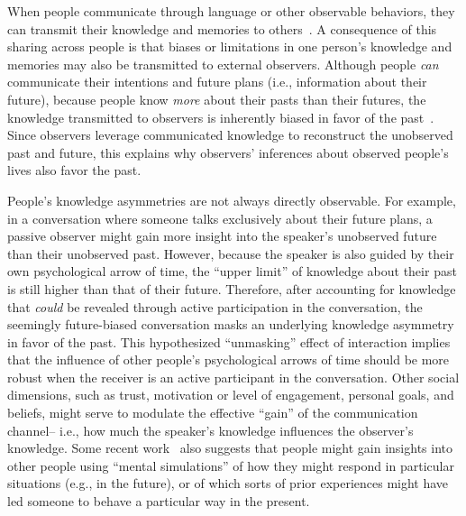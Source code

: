 \documentclass[10pt]{article}
\begin{document}
When people communicate through language or other observable behaviors, they can transmit their knowledge and memories to others~\citep{HirsEcht12, MahrCsib18, Dess07, ZadbEtal17}. A consequence of this sharing across people is that biases or limitations in one person's knowledge and memories may also be transmitted to external observers. Although people \textit{can} communicate their intentions and future plans (i.e., information about their future), because people know \textit{more} about their pasts than their futures, the knowledge transmitted to observers is inherently biased in favor of the past~\citep[Fig.~\ref{fig:discussion}; ][]{DemiEtal18}. Since observers leverage communicated knowledge to reconstruct the unobserved past and future, this explains why observers' inferences about observed people's lives also favor the past.

People's knowledge asymmetries are not always directly observable. For example, in a conversation where someone talks exclusively about their future plans, a passive observer might gain more insight into the speaker's unobserved future than their unobserved past. However, because the speaker is also guided by their own psychological arrow of time, the ``upper limit'' of knowledge about their past is still higher than that of their future. Therefore, after accounting for knowledge that \textit{could} be revealed through active participation in the conversation, the seemingly future-biased conversation masks an underlying knowledge asymmetry in favor of the past. This hypothesized ``unmasking'' effect of interaction implies that the influence of other people's psychological arrows of time should be more robust when the receiver is an active participant in the conversation. Other social dimensions, such as trust, motivation or level of engagement, personal goals, and beliefs, might serve to modulate the effective ``gain'' of the communication channel-- i.e., how much the speaker's knowledge influences the observer's knowledge. Some recent work~\citep[e.g.,][]{TamiMitc13, MeyeEtal19b} also suggests that people might gain insights into other people using ``mental simulations'' of how they might respond in particular situations (e.g., in the future), or of which sorts of prior experiences might have led someone to behave a particular way in the present.
\end{document}
